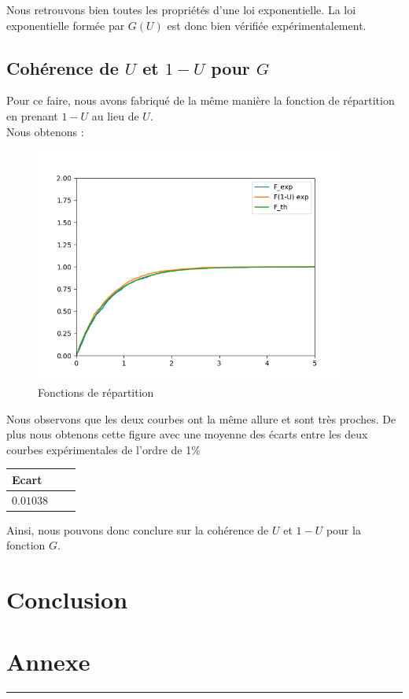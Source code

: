 \documentclass[12,french]{report}
\begin{document}
Nous retrouvons bien toutes les propriétés d'une loi exponentielle. La loi exponentielle formée par $G(U)$ est donc bien vérifiée expérimentalement.\\

\section{Cohérence de $U$ et $1-U$ pour $G$}

Pour ce faire, nous avons fabriqué de la même manière la fonction de répartition en prenant $1-U$ au lieu de $U$.\\

Nous obtenons :

\begin{figure}[H]
	\center
	\includegraphics[width=0.92215\textwidth]{./Images/EcartU}
	\caption{Fonctions de répartition}
\end{figure}\vspace{0.2cm}

Nous observons que les deux courbes ont la même allure et sont très proches. De plus nous obtenons cette figure avec une moyenne des écarts entre les deux courbes expérimentales de l'ordre de 1\%

\begin{center}
\begin{tabular}{|l|c|r|}
				\hline
			    Ecart \\
    			\hline
   				$0.01038$\\
   				\hline
   				\end{tabular}
\end{center}

Ainsi, nous pouvons donc conclure sur la cohérence de $U$ et $1-U$ pour la fonction $G$.

\chapter*{Conclusion}



\chapter*{Annexe}

\hrule
\begin{lstlisting}[caption=Programme en Python]
	
\end{lstlisting}


\end{document}
